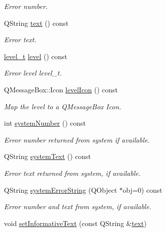 \begin{DoxyCompactItemize}
\begin{DoxyCompactList}\small\item\em Error number. \end{DoxyCompactList}\item 
Q\-String \hyperlink{classmdt_error_a8630bb6b21b70edfe3d13eaff82a1baf}{text} () const 
\begin{DoxyCompactList}\small\item\em Error text. \end{DoxyCompactList}\item 
\hyperlink{classmdt_error_a5c8b1a040e2feaa848f6201d6b6f0cd7}{level\-\_\-t} \hyperlink{classmdt_error_a8d8382d3008de890689df415deb7766e}{level} () const 
\begin{DoxyCompactList}\small\item\em Error level  level\-\_\-t. \end{DoxyCompactList}\item 
Q\-Message\-Box\-::\-Icon \hyperlink{classmdt_error_aac5a7cec9a5d4364f9331c80e1eafe99}{level\-Icon} () const 
\begin{DoxyCompactList}\small\item\em Map the level to a Q\-Message\-Box Icon. \end{DoxyCompactList}\item 
int \hyperlink{classmdt_error_a1be3f45cd56b3142f50c288df9f53204}{system\-Number} () const 
\begin{DoxyCompactList}\small\item\em Error number returned from system if available. \end{DoxyCompactList}\item 
Q\-String \hyperlink{classmdt_error_a6cd449e657f321b86d234269b5e92cda}{system\-Text} () const 
\begin{DoxyCompactList}\small\item\em Error text returned from system, if available. \end{DoxyCompactList}\item 
Q\-String \hyperlink{classmdt_error_a28d22c0b9341faacfef22a7deae2da3c}{system\-Error\-String} (Q\-Object $\ast$obj=0) const 
\begin{DoxyCompactList}\small\item\em Error number and text from system, if available. \end{DoxyCompactList}\item 
void \hyperlink{classmdt_error_a8ef108a0502df7875f1b54bbb2a8919d}{set\-Informative\-Text} (const Q\-String \&\hyperlink{classmdt_error_a8630bb6b21b70edfe3d13eaff82a1baf}{text})

\end{DoxyCompactItemize}
